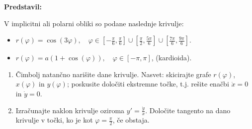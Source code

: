 \textbf{Predstavil:}

V implicitni ali polarni obliki so podane naslednje krivulje:
		\begin{itemize}
				\item $r(\varphi) = \cos(3\varphi), \quad \varphi \in \left[-\frac{\pi}{6}, \frac{\pi}{6} \right] \cup \left[\frac{\pi}{2}, \frac{5\pi}{6} \right] \cup \left[\frac{7\pi}{6}, \frac{9\pi}{6} \right]$.
				\item $r(\varphi) = a(1 + \cos(\varphi)), \quad \varphi \in [-\pi, \pi] $, (kardioida).
		\end{itemize}
		\begin{enumerate}
		\item Čimbolj natančno narišite dane krivulje. Nasvet: skicirajte grafe $r(\varphi)$, $x(\varphi)$ in $y(\varphi)$; poskusite določiti ekstremne točke, t.j. rešite enačbi $\dot{x}=0$ in $\dot{y}=0$.
		\item Izračunajte naklon krivulje oziroma $y' =\frac{\dot{y}}{\dot{x}}$. Določite tangento na dano krivulje v točki, ko je kot $\varphi = \frac{\pi}{2}$, če obstaja.
		\end{enumerate}
